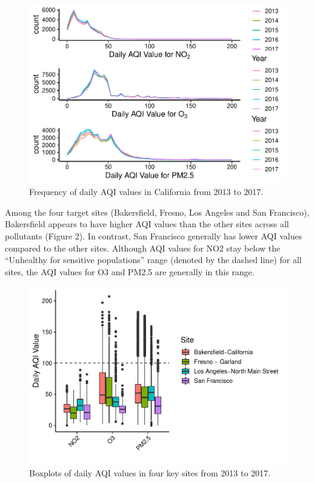 \documentclass[12pt,]{article}
\begin{document}
\begin{figure}
\centering
\includegraphics{FinalProject_AliciaZhao_files/figure-latex/unnamed-chunk-9-1.pdf}
\caption{Frequency of daily AQI values in California from 2013 to 2017.}
\end{figure}

\newpage

Among the four target sites (Bakersfield, Fresno, Los Angeles and San
Francisco), Bakersfield appears to have higher AQI values than the other
sites across all pollutants (Figure 2). In contrast, San Francisco
generally has lower AQI values compared to the other sites. Although AQI
values for NO2 stay below the ``Unhealthy for sensitive populations''
range (denoted by the dashed line) for all sites, the AQI values for O3
and PM2.5 are generally in this range.

\begin{figure}
\centering
\includegraphics{FinalProject_AliciaZhao_files/figure-latex/unnamed-chunk-10-1.pdf}
\caption{Boxplots of daily AQI values in four key sites from 2013 to
2017.}
\end{figure}
\end{document}

